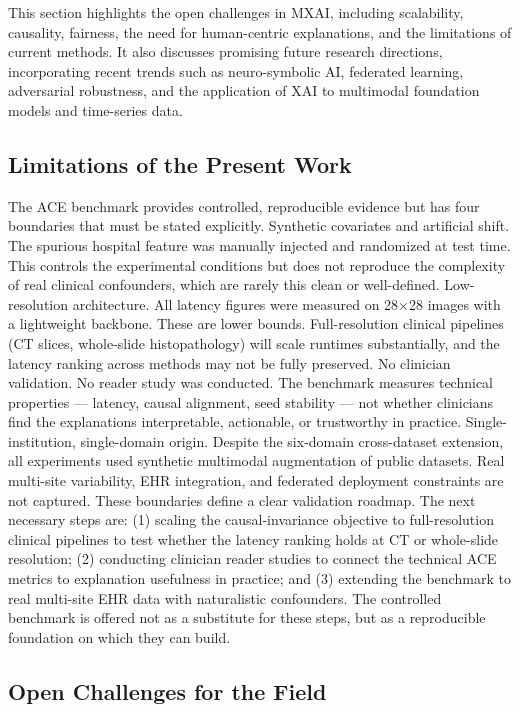 \documentclass[pdflatex,sn-mathphys-num]{sn-jnl}%
\theoremstyle{thmstyleone}%
\theoremstyle{thmstyletwo}%
\theoremstyle{thmstylethree}%
\begin{document}
\begin{itemize}
This section highlights the open challenges in MXAI, including scalability, causality, fairness, the need for human-centric explanations, and the limitations of current methods. It also discusses promising future research directions, incorporating recent trends such as neuro-symbolic AI, federated learning, adversarial robustness, and the application of XAI to multimodal foundation models and time-series data.

\subsection{Limitations of the Present Work}
The ACE benchmark provides controlled, reproducible evidence but has four boundaries that must be stated explicitly.
Synthetic covariates and artificial shift. The spurious hospital feature was manually injected and randomized at test time. This controls the experimental conditions but does not reproduce the complexity of real clinical confounders, which are rarely this clean or well-defined.
Low-resolution architecture. All latency figures were measured on 28×28 images with a lightweight backbone. These are lower bounds. Full-resolution clinical pipelines (CT slices, whole-slide histopathology) will scale runtimes substantially, and the latency ranking across methods may not be fully preserved.
No clinician validation. No reader study was conducted. The benchmark measures technical properties — latency, causal alignment, seed stability — not whether clinicians find the explanations interpretable, actionable, or trustworthy in practice.
Single-institution, single-domain origin. Despite the six-domain cross-dataset extension, all experiments used synthetic multimodal augmentation of public datasets. Real multi-site variability, EHR integration, and federated deployment constraints are not captured. These boundaries define a clear validation roadmap. The next necessary steps are: (1) scaling the causal-invariance objective to full-resolution clinical pipelines to test whether the latency ranking holds at CT or whole-slide resolution; (2) conducting clinician reader studies to connect the technical ACE metrics to explanation usefulness in practice; and (3) extending the benchmark to real multi-site EHR data with naturalistic confounders. The controlled benchmark is offered not as a substitute for these steps, but as a reproducible foundation on which they can build.

\subsection{Open Challenges for the Field}


\end{itemize}
\end{document}
